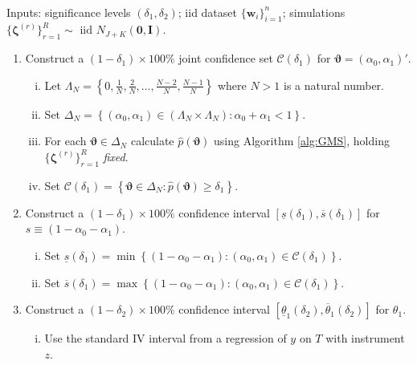 \begin{alg} \mbox{}\\
    Inputs: significance levels $(\delta_1,\delta_2)$; 
    iid dataset $\{\mathbf{w}_i\}_{i=1}^n$;
    simulations $\{\boldsymbol{\zeta}^{(r)}\}_{r=1}^R \sim \mbox{ iid } N_{J+K}(\mathbf{0}, \mathbf{I})$.
    \begin{enumerate}
    \item Construct a $(1 - \delta_1)\times 100\%$ joint confidence set $\mathcal{C}(\delta_1)$ for $\boldsymbol{\vartheta} = (\alpha_0, \alpha_1)'$. 
      \begin{enumerate}[(i)]
        \item Let $\Lambda_N = \left\{0, \frac{1}{N}, \frac{2}{N}, \hdots, \frac{N-2}{N}, \frac{N-1}{N}\right\}$ where $N>1$ is a natural number. 
        \item Set $\Delta_N = \left\{(\alpha_0, \alpha_1) \in (\Lambda_N \times \Lambda_N) \colon \alpha_0 + \alpha_1 < 1 \right\}$.
        \item For each $\boldsymbol{\vartheta} \in \Delta_N$ calculate $\widehat{p}(\boldsymbol{\vartheta})$ using Algorithm \ref{alg:GMS}, holding $\{ \boldsymbol{\zeta}^{(r)} \}_{r=1}^R$ \emph{fixed}. 
        \item Set $\mathcal{C}(\delta_1) = \left\{ \boldsymbol{\vartheta} \in \Delta_N \colon \widehat{p}(\boldsymbol{\vartheta}) \geq \delta_1\right\}$.
      \end{enumerate}
    \item Construct a $(1 - \delta_1)\times 100\%$ confidence interval $\left[\underline{s}(\delta_1), \overline{s}(\delta_1) \right]$ for $s \equiv (1 - \alpha_0 - \alpha_1)$.
      \begin{enumerate}[(i)]
        \item Set $\underline{s}(\delta_1) = \min \left\{ (1 - \alpha_0 - \alpha_1) \colon (\alpha_0, \alpha_1) \in \mathcal{C}(\delta_1) \right\}$.
        \item Set $\overline{s}(\delta_1) = \max \left\{ (1 - \alpha_0 - \alpha_1) \colon (\alpha_0, \alpha_1) \in \mathcal{C}(\delta_1) \right\}$.
      \end{enumerate}
    \item Construct a $(1 - \delta_2)\times 100\%$ confidence interval $\left[\underline{\theta}_1(\delta_2), \overline{\theta}_1(\delta_2)\right]$ for $\theta_1$.
      \begin{enumerate}[(i)]
        \item Use the standard IV interval from a regression of $y$ on $T$ with instrument $z$.

\end{enumerate}
\end{enumerate}
\end{alg}
